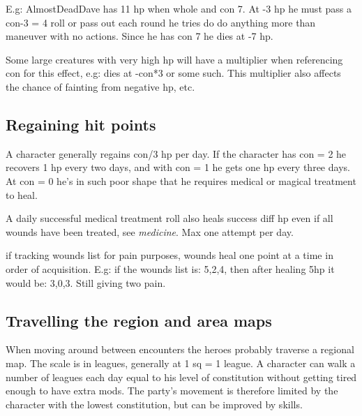 E.g: AlmostDeadDave has 11 hp when whole and con 7. At -3 hp he must pass a con-3 = 4 roll or pass out each round he tries do do anything more than maneuver with no actions. Since he has con 7 he dies at -7 hp.

Some large creatures with very high hp will have a multiplier when referencing con for this effect, e.g: dies at -con*3 or some such. This multiplier also affects the chance of fainting from negative hp, etc.


\subsection*{Regaining hit points}
A character generally regains con/3 hp per day. If the character has con = 2 he recovers 1 hp every two days, and with con = 1 he gets one hp every three days. At con = 0 he's in such poor shape that he requires medical or magical treatment to heal.

A daily successful medical treatment roll also heals success diff hp even if all wounds have been treated, see \emph{medicine}. Max one attempt per day.

if tracking wounds list for pain purposes, wounds heal one point at a time in order of acquisition. E.g: if the wounds list is: 5,2,4, then after healing 5hp it would be: 3,0,3. Still giving two pain.

















\subsection*{Travelling the region and area maps}
When moving around between encounters the heroes probably traverse a regional map. The scale is in leagues, generally at 1 sq = 1 league. A character can walk a number of leagues each day equal to his level of constitution without getting tired enough to have extra mods. The party's movement is therefore limited by the character with the lowest constitution, but can be improved by skills.

